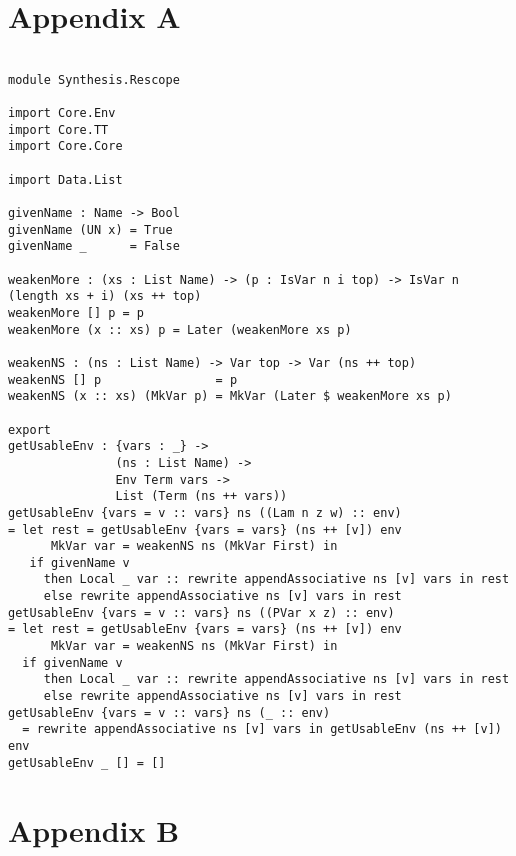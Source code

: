 \documentclass[a4paper]{article}
\begin{document}
\clearpage
\nocite{*}

\clearpage
\section{Appendix A}
\label{sec:org8a4d2d3}

\begin{center}
\begin{verbatim}

module Synthesis.Rescope 

import Core.Env
import Core.TT
import Core.Core

import Data.List

givenName : Name -> Bool
givenName (UN x) = True
givenName _      = False

weakenMore : (xs : List Name) -> (p : IsVar n i top) -> IsVar n (length xs + i) (xs ++ top)
weakenMore [] p = p
weakenMore (x :: xs) p = Later (weakenMore xs p)

weakenNS : (ns : List Name) -> Var top -> Var (ns ++ top)
weakenNS [] p                = p
weakenNS (x :: xs) (MkVar p) = MkVar (Later $ weakenMore xs p)

export
getUsableEnv : {vars : _} -> 
			   (ns : List Name) ->
			   Env Term vars ->
			   List (Term (ns ++ vars))
getUsableEnv {vars = v :: vars} ns ((Lam n z w) :: env) 
= let rest = getUsableEnv {vars = vars} (ns ++ [v]) env 
	  MkVar var = weakenNS ns (MkVar First) in
   if givenName v 
	 then Local _ var :: rewrite appendAssociative ns [v] vars in rest
	 else rewrite appendAssociative ns [v] vars in rest
getUsableEnv {vars = v :: vars} ns ((PVar x z) :: env) 
= let rest = getUsableEnv {vars = vars} (ns ++ [v]) env 
	  MkVar var = weakenNS ns (MkVar First) in
  if givenName v 
	 then Local _ var :: rewrite appendAssociative ns [v] vars in rest
	 else rewrite appendAssociative ns [v] vars in rest
getUsableEnv {vars = v :: vars} ns (_ :: env) 
  = rewrite appendAssociative ns [v] vars in getUsableEnv (ns ++ [v]) env
getUsableEnv _ [] = []

\end{verbatim}
\end{center}
\clearpage

\section{Appendix B}
\label{sec:org20f49c4}
\end{document}
